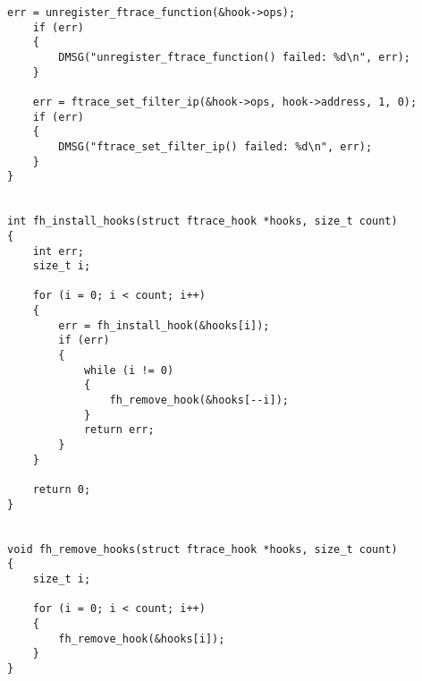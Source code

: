 \begin{lstlisting}[label=code:hook2,caption=Файл hook.c]
	err = unregister_ftrace_function(&hook->ops);
	if (err) 
	{
		DMSG("unregister_ftrace_function() failed: %d\n", err);
	}
	
	err = ftrace_set_filter_ip(&hook->ops, hook->address, 1, 0);
	if (err) 
	{
		DMSG("ftrace_set_filter_ip() failed: %d\n", err);
	}
}


int fh_install_hooks(struct ftrace_hook *hooks, size_t count)
{
	int err;
	size_t i;
	
	for (i = 0; i < count; i++) 
	{
		err = fh_install_hook(&hooks[i]);
		if (err)
		{
			while (i != 0) 
			{
				fh_remove_hook(&hooks[--i]);
			}
			return err;
		}
	}
	
	return 0;
}


void fh_remove_hooks(struct ftrace_hook *hooks, size_t count)
{
	size_t i;
	
	for (i = 0; i < count; i++)
	{
		fh_remove_hook(&hooks[i]);
	}
}
\end{lstlisting}